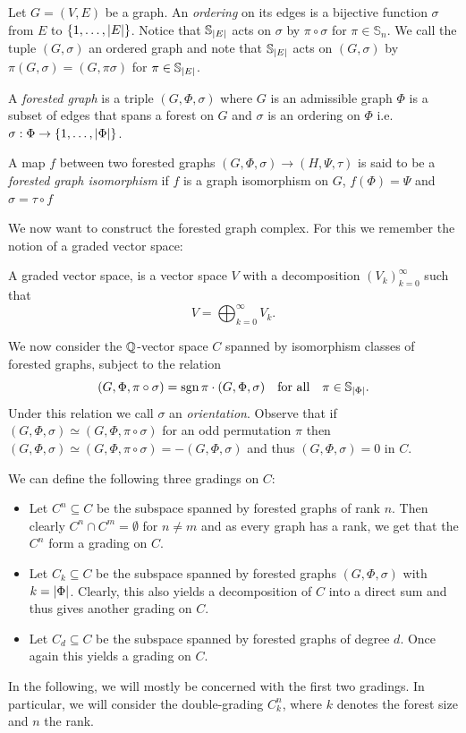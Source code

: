 \begin{definition}
	Let $G = (V,E)$ be a graph. An \emph{ordering} on its edges is a bijective function $\sigma$ from $E$ to $\{1,\ldots,\abs{E}\}$.
	Notice that $\mathbb{S}_{\abs{E}}$ acts on $\sigma$ by $\pi \circ \sigma$ for $\pi \in \mathbb{S}_{n}$.
	We call the tuple $(G,\sigma)$ an ordered graph and note that $\mathbb{S}_{\abs{E}}$ acts on $(G,\sigma)$ by $\pi (G,\sigma) = (G,\pi \sigma)$ for $\pi \in \mathbb{S}_{\abs{E}}$.

	A \emph{forested graph} is a triple $(G,\Phi,\sigma)$ where $G$ is an admissible graph $\Phi$ is a subset of edges that spans a forest on $G$ and 
	$\sigma$ is an ordering on $\Phi$ i.e. $\sigma : \Phi \to \{1,\ldots,\abs{\Phi}\}$.

	A map $f$ between two forested graphs $(G,\Phi, \sigma) \to (H,\Psi, \tau)$ is said to be a \emph{forested graph isomorphism} if 
	$f$ is a graph isomorphism on $G$,  $f(\Phi) = \Psi$ and $\sigma = \tau \circ f $
\end{definition}

We now want to construct the forested graph complex. For this we remember the notion of a graded vector space:
\begin{definition}
	A graded vector space, is a vector space $V$ with a decomposition $\left(V_{k}\right)^{\infty}_{k=0} $ such that
	\[
		V = \bigoplus_{k=0}^{\infty} V_{k}
	.\] 
\end{definition}

We now consider the $\mathbb{Q}$-vector space $C$ spanned by isomorphism classes of forested graphs, subject to the relation
\[
	(G,\Phi, \pi \circ \sigma) = \sgn{\pi} \cdot (G,\Phi, \sigma) \qq{for all} \pi \in \mathbb{S}_{\abs{\Phi}}
.\]
Under this relation we call $\sigma$ an \emph{orientation}.
Observe that if $(G,\Phi, \sigma) \simeq (G,\Phi, \pi \circ \sigma)$ for an odd permutation $\pi$ then 
$(G,\Phi, \sigma) \simeq (G,\Phi, \pi \circ \sigma) = - (G,\Phi, \sigma)$ and thus $(G,\Phi, \sigma) = 0$ in  $C$.

We can define the following three gradings on $C$:
 \begin{itemize}
	\item Let $C^{n} \subseteq C$ be the subspace spanned by forested graphs of rank $n$. Then clearly  $C^{n} \cap C^{m} = \emptyset$ for $n \neq m$ and
		as every graph has a rank, we get that the $C^{n}$ form a grading on $C$.
	\item Let $C_{k} \subseteq C$ be the subspace spanned by forested graphs $(G,\Phi,\sigma)$ with $k = \abs{\Phi}$. Clearly, this also yields a decomposition of $C$ into a direct sum
		and thus gives another grading on $C$.
	\item Let  $C_{d} \subseteq C$ be the subspace spanned by forested graphs of degree $d$. Once again this yields a grading on $C$.
\end{itemize}
In the following, we will mostly be concerned with the first two gradings. In particular, we will consider the double-grading $C_{k}^{n}$,
where $k$ denotes the forest size and $n$ the rank. 

